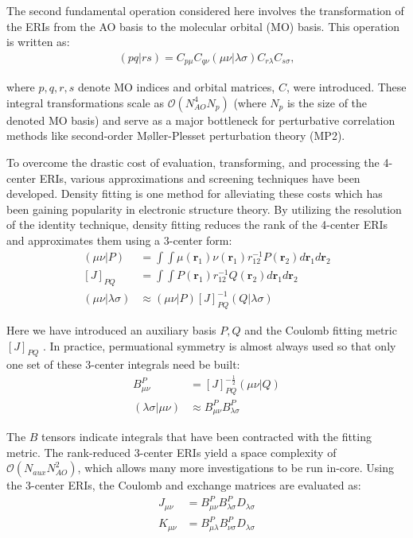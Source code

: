 The second fundamental operation considered here involves the transformation of the ERIs from the AO basis 
to the molecular orbital (MO) basis. This operation is written as:
\begin{align}
(pq | rs) = C_{p \mu}C_{q \nu}
(\mu \nu | \lambda \sigma)C_{r\lambda}C_{s\sigma},
\end{align} 

\noindent where $p,q,r,s$ denote MO indices and orbital matrices, $C$, were introduced. These integral transformations scale 
as $\mathcal{O}(N_{AO}^4N_p)$ (where $N_p$ is the size of the denoted MO basis) and serve as a major 
bottleneck for perturbative correlation methods like second-order M{\o}ller-Plesset perturbation theory (MP2).

To overcome the drastic cost of evaluation, transforming, and processing the 4-center ERIs, various approximations 
and screening techniques have been developed. 
Density fitting is one method for alleviating these costs which has been gaining popularity in electronic structure theory.
By utilizing the resolution of the identity technique, 
density fitting reduces the rank of the 4-center ERIs and approximates them using a 3-center form: 
\begin{align} 
(\mu \nu|P) &= \int \int \mu(\textbf{r}_{1}) 
\nu(\textbf{r}_{1}) r^{-1}_{12} P(\textbf{r}_{2}) d\textbf{r}_{1} d\textbf{r}_{2} \\
[J]_{PQ} &= \int \int P(\textbf{r}_1)r_{12}^{-1}Q(\textbf{r}_2) d{\textbf{r}_{1}}d{\textbf{r}_{2}} \\
(\mu \nu|\lambda \sigma) &\approx (\mu \nu| P)[J]_{PQ}^{-1}(Q|\lambda \sigma)  
\end{align} 

\noindent Here we have introduced an auxiliary basis $P, Q$ and the Coulomb fitting metric $[J]_{PQ}$ \cite{ref2}. 
In practice, permuational symmetry is almost always used so that only one set of these 3-center integrals need be built:
\begin{align} 
B_{\mu \nu}^P &= [J]_{PQ}^{-\frac{1}{2}}(\mu \nu | Q)  \\ 
(\lambda \sigma | \mu \nu) &\approx  B_{\mu \nu}^P B_{\lambda \sigma}^P  \end{align} 

\noindent The $B$ tensors indicate integrals that have been contracted with the fitting metric.
The rank-reduced 3-center ERIs yield a space complexity of $\mathcal{O}(N_{aux}N_{AO}^2)$, 
which allows many more investigations to be run in-core. 
Using the 3-center ERIs, the Coulomb and exchange matrices are evaluated as: 
\begin{align}
J_{\mu \nu} &= B_{\mu \nu}^P B_{\lambda \sigma}^PD_{\lambda \sigma} \\
K_{\mu \nu} &= B_{\mu \lambda}^P B_{\nu \sigma}^PD_{\lambda \sigma}
\end{align}

